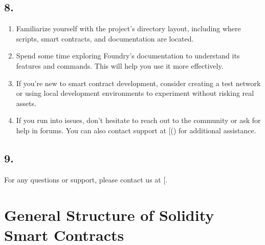 \documentclass[a4paper,10pt,english]{sphinxmanual}
\begin{document}
\section{8. }
\label{\detokenize{quickstart:additional-tips-for-beginners}}\begin{enumerate}
%
\item {} 
\sphinxAtStartPar
{}

\sphinxAtStartPar
Familiarize yourself with the project’s directory layout, including where scripts, smart contracts, and documentation are located.

\item {} 
\sphinxAtStartPar
{}

\sphinxAtStartPar
Spend some time exploring Foundry’s documentation to understand its features and commands. This will help you use it more effectively.

\item {} 
\sphinxAtStartPar
{}

\sphinxAtStartPar
If you’re new to smart contract development, consider creating a test network or using local development environments to experiment without risking real assets.

\item {} 
\sphinxAtStartPar
{}

\sphinxAtStartPar
If you run into issues, don’t hesitate to reach out to the community or ask for help in forums. You can also contact support at {[}\sphinxhref{mailto:your-email@example.com}{your\sphinxhyphen{}email@example.com}{]}() for additional assistance.

\end{enumerate}


\section{9. }
\label{\detokenize{quickstart:contact-and-support}}
\sphinxAtStartPar
For any questions or support, please contact us at {[}\sphinxhref{mailto:starlose13@gmail.com}{starlose13@gmail.com}{]}.

\sphinxstepscope


\chapter{General Structure of Solidity Smart Contracts}
\label{\detokenize{contracts_structure:general-structure-of-solidity-smart-contracts}}\label{\detokenize{contracts_structure::doc}}
\end{document}
